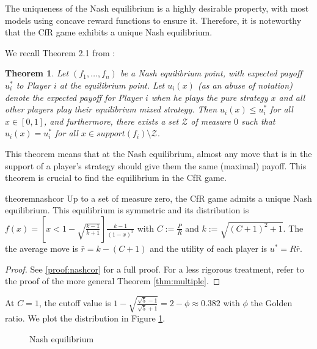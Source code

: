 \documentclass[preprint,12pt,authoryear]{elsarticle}
\newtheorem{theorem}{Theorem}[section]
\theoremstyle{definition}
\begin{document}
The uniqueness of the Nash equilibrium is a highly desirable property, with most models using concave reward functions to ensure it. Therefore, it is noteworthy that the CfR game exhibits a unique Nash equilibrium.

We recall Theorem 2.1 from \citet{Lotker2008-tx}:

\begin{theorem}
\label{thm:jules}
Let $(f_1, \ldots , f_n)$ be a Nash equilibrium point, with expected payoff $u_i^*$ to Player $i$ at the equilibrium point. Let $u_i(x)$ (as an abuse of notation) denote the expected payoff for Player $i$ when he plays the pure strategy $x$ and all other players play their equilibrium mixed strategy. Then $u_i(x) \leq u_i^*$ for all $x \in [0, 1]$, and furthermore, there exists a set $\mathcal{Z}$ of measure $0$ such that $u_i(x) = u_i^*$ for all $x \in support(f_i) \setminus \mathcal{Z}$.
\end{theorem}

This theorem means that at the Nash equilibrium, almost any move that is in the support of a player's strategy should give them the same (maximal) payoff. This theorem is crucial to find the equilibrium in the CfR game.

\begin{restatable}{theorem}{nashcor}
\label{thm:nashcor}
Up to a set of measure zero, the CfR game admits a unique Nash equilibrium. This equilibrium is symmetric and its distribution is $f(x) = \left[x < 1 - \sqrt{\frac{k - 1}{k + 1}}\right] \frac{ k - 1}{(1-x)^3}$ with $C := \frac{P}{R}$ and $k := \sqrt{(C + 1)^2 + 1}$. The the average move is $\bar r = k - (C+1)$ and the utility of each player is $u^* = R \bar r$.
\end{restatable}

\begin{proof}
    See \ref{proof:nashcor} for a full proof. For a less rigorous treatment, refer to the proof of the more general Theorem \ref{thm:multiple}.
\end{proof}

At $C = 1$, the cutoff value is $1 - \sqrt{\frac{\sqrt{5} - 1}{\sqrt{5} + 1}} = 2 - \phi \approx 0.382$ with $\phi$ the Golden ratio. We plot the distribution in Figure \ref{fig:nash}.


\begin{figure}[htbp]
  \centering
  \begin{minipage}[t]{0.48\textwidth}
    \centering
    
  \end{minipage}
  \hfill
  \begin{minipage}[t]{0.48\textwidth}
    \centering
    
  \end{minipage}
  \caption{Nash equilibrium}
  \label{fig:nash}  
\end{figure}
\end{document}
